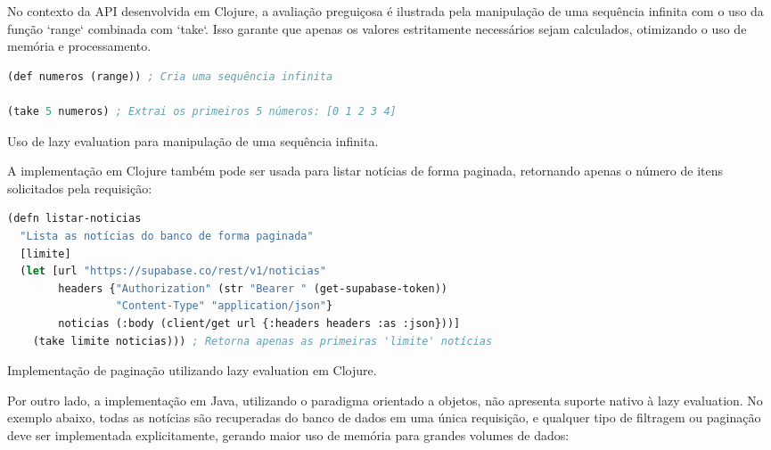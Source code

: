 No contexto da API desenvolvida em Clojure, a avaliação preguiçosa é ilustrada pela manipulação de uma sequência infinita com o uso da função `range` combinada com `take`. Isso garante que apenas os valores estritamente necessários sejam calculados, otimizando o uso de memória e processamento. 

\begin{tcolorbox}[colback=gray!5!white, colframe=gray!75!black, title={Quadro 9 - Exemplo de Lazy Evaluation em Clojure}]
\begin{lstlisting}[language=Lisp]
(def numeros (range)) ; Cria uma sequência infinita

(take 5 numeros) ; Extrai os primeiros 5 números: [0 1 2 3 4]
\end{lstlisting}
\caption{Uso de lazy evaluation para manipulação de uma sequência infinita.}
\end{tcolorbox}

A implementação em Clojure também pode ser usada para listar notícias de forma paginada, retornando apenas o número de itens solicitados pela requisição:

\begin{tcolorbox}[colback=gray!5!white, colframe=gray!75!black, title={Quadro 10 - Exemplo de Paginação com Lazy Evaluation em Clojure}]
\begin{lstlisting}[language=Lisp]
(defn listar-noticias
  "Lista as notícias do banco de forma paginada"
  [limite]
  (let [url "https://supabase.co/rest/v1/noticias"
        headers {"Authorization" (str "Bearer " (get-supabase-token))
                 "Content-Type" "application/json"}
        noticias (:body (client/get url {:headers headers :as :json}))]
    (take limite noticias))) ; Retorna apenas as primeiras 'limite' notícias
\end{lstlisting}
\caption{Implementação de paginação utilizando lazy evaluation em Clojure.}
\end{tcolorbox}

Por outro lado, a implementação em Java, utilizando o paradigma orientado a objetos, não apresenta suporte nativo à lazy evaluation. No exemplo abaixo, todas as notícias são recuperadas do banco de dados em uma única requisição, e qualquer tipo de filtragem ou paginação deve ser implementada explicitamente, gerando maior uso de memória para grandes volumes de dados:

